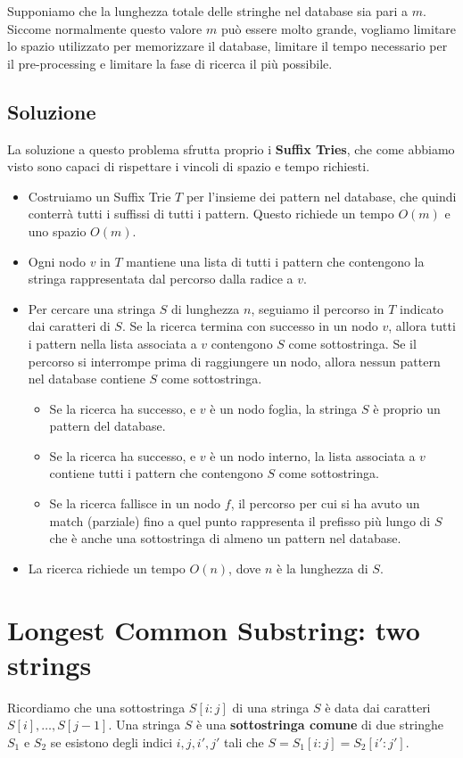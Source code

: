Supponiamo che la lunghezza totale delle stringhe nel database sia pari a $m$. Siccome normalmente questo valore $m$ può essere molto grande, vogliamo limitare lo spazio utilizzato per memorizzare il database, limitare il tempo necessario per il pre-processing e limitare la fase di ricerca il più possibile.

\subsection*{Soluzione}
La soluzione a questo problema sfrutta proprio i \textbf{Suffix Tries}, che come abbiamo visto sono capaci di rispettare i vincoli di spazio e tempo richiesti.
\begin{itemize}
    \item Costruiamo un Suffix Trie $T$ per l'insieme dei pattern nel database, che quindi conterrà tutti i suffissi di tutti i pattern. Questo richiede un tempo $O(m)$ e uno spazio $O(m)$.
    \item Ogni nodo $v$ in $T$ mantiene una lista di tutti i pattern che contengono la stringa rappresentata dal percorso dalla radice a $v$.
    \item Per cercare una stringa $S$ di lunghezza $n$, seguiamo il percorso in $T$ indicato dai caratteri di $S$. Se la ricerca termina con successo in un nodo $v$, allora tutti i pattern nella lista associata a $v$ contengono $S$ come sottostringa. Se il percorso si interrompe prima di raggiungere un nodo, allora nessun pattern nel database contiene $S$ come sottostringa.
    \begin{itemize}
        \item Se la ricerca ha successo, e $v$ è un nodo foglia, la stringa $S$ è proprio un pattern del database.
        \item Se la ricerca ha successo, e $v$ è un nodo interno, la lista associata a $v$ contiene tutti i pattern che contengono $S$ come sottostringa.
        \item Se la ricerca fallisce in un nodo $f$, il percorso per cui si ha avuto un match (parziale) fino a quel punto rappresenta il prefisso più lungo di $S$ che è anche una sottostringa di almeno un pattern nel database.
    \end{itemize}
    \item La ricerca richiede un tempo $O(n)$, dove $n$ è la lunghezza di $S$.
\end{itemize}



\clearpage
\section{Longest Common Substring: two strings}
Ricordiamo che una sottostringa $S[i:j]$ di una stringa $S$ è data dai caratteri $S[i], \ldots, S[j-1]$.
Una stringa $S$ è una \textbf{sottostringa comune} di due stringhe $S_1$ e $S_2$ se esistono degli indici $i, j, i', j'$ tali che $S = S_1[i:j] = S_2[i':j']$.

